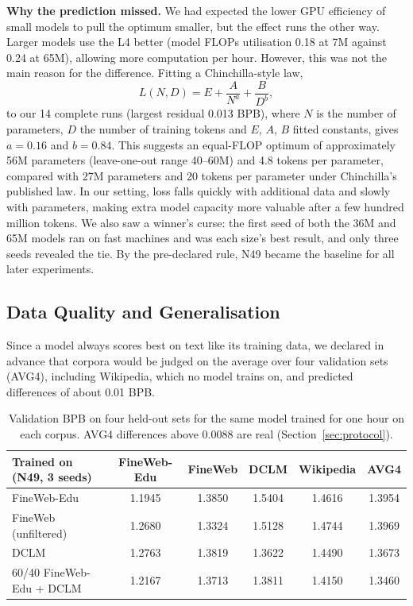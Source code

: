 \documentclass[11pt,a4paper]{article}
\begin{document}
\textbf{Why the prediction missed.} We had expected the lower GPU efficiency of small models to pull the optimum smaller, but the effect runs the other way. Larger models use the L4 better (model FLOPs utilisation 0.18 at 7M against 0.24 at 65M), allowing more computation per hour. However, this was not the main reason for the difference. Fitting a Chinchilla-style law,
\begin{equation}
  L(N, D) = E + \frac{A}{N^{a}} + \frac{B}{D^{b}},
  \label{eq:law}
\end{equation}
to our 14 complete runs (largest residual 0.013 BPB), where $N$ is the number of parameters, $D$ the number of training tokens and $E$, $A$, $B$ fitted constants, gives $a = 0.16$ and $b = 0.84$. This suggests an equal-FLOP optimum of approximately 56M parameters (leave-one-out range 40--60M) and 4.8 tokens per parameter, compared with 27M parameters and 20 tokens per parameter under Chinchilla's published law. In our setting, loss falls quickly with additional data and slowly with parameters, making extra model capacity more valuable after a few hundred million tokens. We also saw a winner's curse: the first seed of both the 36M and 65M models ran on fast machines and was each size's best result, and only three seeds revealed the tie. By the pre-declared rule, N49 became the baseline for all later experiments.

\subsection{Data Quality and Generalisation}\label{sec:data}

Since a model always scores best on text like its training data, we declared in advance that corpora would be judged on the average over four validation sets (AVG4), including Wikipedia, which no model trains on, and predicted differences of about 0.01 BPB.

\begin{table}[ht]
\centering\small
\begin{tabular}{lccccc}
\toprule
\textbf{Trained on (N49, 3 seeds)} & \textbf{FineWeb-Edu} & \textbf{FineWeb} & \textbf{DCLM} & \textbf{Wikipedia} & \textbf{AVG4} \\
\midrule
FineWeb-Edu & 1.1945 & 1.3850 & 1.5404 & 1.4616 & 1.3954 \\
FineWeb (unfiltered) & 1.2680 & 1.3324 & 1.5128 & 1.4744 & 1.3969 \\
DCLM & 1.2763 & 1.3819 & 1.3622 & 1.4490 & 1.3673 \\
60/40 FineWeb-Edu + DCLM & 1.2167 & 1.3713 & 1.3811 & 1.4150 & 1.3460 \\
\bottomrule
\end{tabular}
\caption{Validation BPB on four held-out sets for the same model trained for one hour on each corpus. AVG4 differences above 0.0088 are real (Section~\ref{sec:protocol}).}
\label{tab:data}
\end{table}
\end{document}
